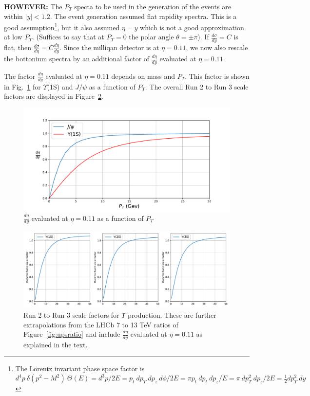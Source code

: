 \documentclass[12pt]{article}
\begin{document}
{\bf HOWEVER:} The $P_T$ specta to be used in the generation of the events
are within $|y|<1.2$.  The event generation assumed flat rapidity
spectra.   This is a good assumption\footnote{The Lorentz invariant phase
  space factor is  $d^4p~\delta(p^2-M^2)~\Theta(E) = d^3p/2E =
  p_t~dp_T~dp_z~d\phi/2E = \pi p_t~dp_t~dp_z/E = \pi~dp^2_T~dp_z/2E = \frac{1}{2} dp^2_T~dy $},
but it also assumed $\eta = y$ which
is not a good  approximation at low $P_T$.  (Suffices to say that at
$P_T=0$ the polar angle $\theta=\pm \pi$).  If $\frac{d\sigma}{dy} = C$ is
flat, then $\frac{d\sigma}{d\eta}= C \frac{d\eta}{dy}$.  Since the milliqan
detector is at $\eta=0.11$, we now also rescale the bottonium spectra
by an additional factor of $\frac{d\eta}{dy}$ evaluated at $\eta=0.11$.

The factor $\frac{d\eta}{dy}$ evaluated at $\eta=0.11$ depends on
mass and $P_T$.  This factor is shown in
Fig.~\ref{fig:detady} for $\Upsilon$(1S) and $J/\psi$ as a function of $P_T$.
The overall Run 2 to Run 3 scale factors are
displayed in Figure~\ref{fig:ups_run_2_run_3_sf}.

\begin{figure}[H]
  \begin{center}
    \includegraphics[width=1.0\linewidth]{../misc/deta-dy.pdf}
    \caption{\protect $\frac{d\eta}{dy}$ evaluated at $\eta=0.11$ as a
    function of $P_T$}
\label{fig:detady}
\end{center}
\end{figure}

\begin{figure}[H]
  \begin{center}
    \includegraphics[width=1.0\linewidth]{../oniaDirect/upsilon/Run2_to_Run3_scale.pdf}
    \caption{\protect Run 2 to Run 3 scale factors for $\Upsilon$ production.  These 
      are further extrapolations from the LHCb 7 to 13 TeV ratios 
      of Figure~\ref{fig:upsratio} and include $\frac{d\eta}{dy}$
      evaluated at $\eta=0.11$
      as explained in the text.}
\label{fig:ups_run_2_run_3_sf}
\end{center}
\end{figure}
\end{document}
